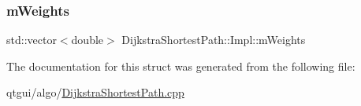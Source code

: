 \mbox{\label{struct_dijkstra_shortest_path_1_1_impl_a870a9acd188de69c5672cb72f9d8f809}} 
\subsubsection{\texorpdfstring{mWeights}{mWeights}}
{\footnotesize\ttfamily std\+::vector$<$double$>$ Dijkstra\+Shortest\+Path\+::\+Impl\+::m\+Weights}



The documentation for this struct was generated from the following file\+:\begin{DoxyCompactItemize}
\item 
qtgui/algo/\mbox{\hyperlink{_dijkstra_shortest_path_8cpp}{Dijkstra\+Shortest\+Path.\+cpp}}\end{DoxyCompactItemize}
